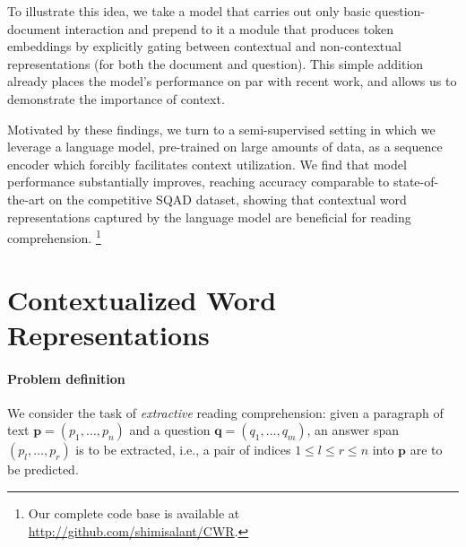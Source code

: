 \documentclass[11pt,a4paper]{article}
\newcommand{\squad}{\textsc{SQ\normalfont{u}AD}}
\begin{document}
To illustrate this idea, we take a model that carries out only basic question-document interaction and prepend to it a module that produces token embeddings by explicitly gating between contextual and non-contextual representations (for both the document and question). This simple addition already places the model's performance on par with recent work, and allows us to demonstrate the importance of context.

Motivated by these findings, we turn to a semi-supervised setting in which we leverage a language model, pre-trained on large amounts of data, as a sequence encoder which forcibly facilitates context utilization. We find that model performance substantially improves, reaching accuracy comparable to state-of-the-art on the competitive \squad{} dataset, showing that contextual word representations captured by the language model are beneficial for reading comprehension.
\footnote{Our complete code base is available at {\small{\url{http://github.com/shimisalant/CWR}}}.}
 
\section{Contextualized Word Representations}
\label{sec:model}

\paragraph{Problem definition} We consider the task of \textit{extractive} reading comprehension: given a paragraph of text
$\mathbf{p}=(p_1,\dots,p_n)$
and a question
$\mathbf{q}=(q_1,\dots,q_m)$, an answer span $(p_l,\dots,p_r)$ is to be extracted, i.e., a pair of indices $1\leq l \leq r \leq n$ into $\mathbf{p}$ are to be predicted.
\end{document}
